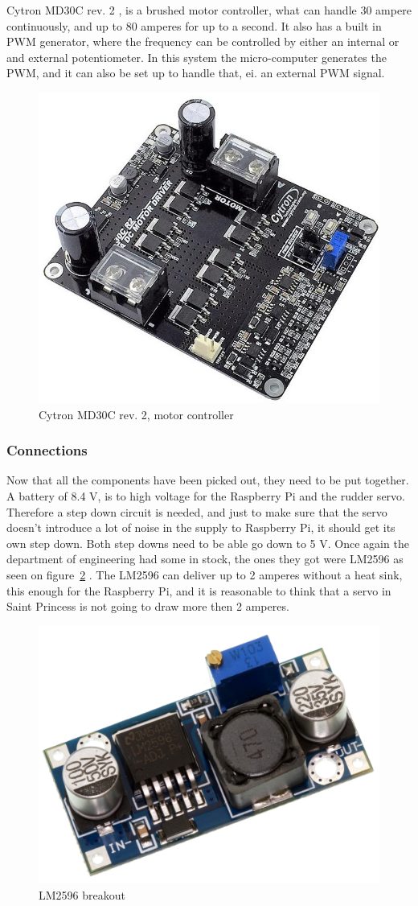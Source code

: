 Cytron MD30C rev. 2 \cite{md30}, is a brushed motor controller, what can handle 30 ampere continuously, and up to 80 amperes for up to a second. It also has a built in PWM generator, where the frequency can be controlled by either an internal or and external potentiometer. In this system the micro-computer generates the PWM, and it can also be set up to handle that, ei. an external PWM signal.

\begin{figure}[H]
\centering
\includegraphics[width=0.7\linewidth]{Images/Design/cytron}
\caption{Cytron MD30C rev. 2, motor controller}
\label{fig:cytron}
\end{figure}

\subsubsection{Connections}
Now that all the components have been picked out, they need to be put together. 
A battery of 8.4 V, is to high voltage for the Raspberry Pi and the rudder servo. Therefore a step down circuit is needed, and just to make sure that the servo doesn't introduce a lot of noise in the supply to Raspberry Pi, it should get its own step down. Both step downs need to be able go down to 5 V. Once again the department of engineering had some in stock, the ones they got were LM2596 as seen on figure~\ref{fig:stepdown} \cite{stepdown}. The LM2596 can deliver up to 2 amperes without a heat sink, this enough for the Raspberry Pi, and it is reasonable to think that a servo in Saint Princess is not going to draw more then 2 amperes.
\begin{figure}[H]
\centering
\includegraphics[width=0.4\linewidth]{Images/Design/stepdown}
\caption{LM2596 breakout}
\label{fig:stepdown}
\end{figure}

